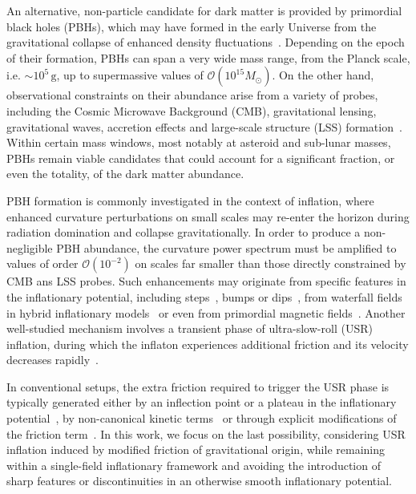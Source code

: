 \documentclass[nofootinbib,aps,a4paper,letterpaper,superscriptaddress,
twocolumn,times]{revtex4}
\renewcommand{\(}{\left(}
\renewcommand{\)}{\right)}
\renewcommand{\(}{\left(}
\renewcommand{\)}{\right)}
\renewcommand{\[}{\left[}
\renewcommand{\]}{\right]}
\begin{document}
An alternative, non-particle candidate for dark matter is provided by primordial 
black holes (PBHs), which may have formed in the early Universe from the 
gravitational collapse of enhanced density fluctuations~\cite{Zeldovich:1967lct, 
Hawking:1971ei, Carr:1974nx}. Depending on the epoch of their formation, PBHs 
can span a very wide mass range, from the Planck scale, i.e. $\sim 
10^{5}\,\mathrm{g}$, up to supermassive values of $\mathcal{O}(10^{15}M_\odot)$. 
On the other hand, observational constraints on their abundance arise from a 
variety of probes, including the Cosmic Microwave Background (CMB), 
gravitational lensing, gravitational waves, accretion effects and large-scale 
structure (LSS) formation~\cite{Sasaki:2018dmp,Carr:2020gox, Green:2020jor,Escriva:2022duf}. Within 
certain mass windows, most notably at asteroid and sub-lunar masses, PBHs remain 
viable candidates that could account for a significant fraction, or even the 
totality, of the dark matter abundance.

PBH formation is commonly investigated in the context of inflation, where 
enhanced curvature perturbations on small scales may re-enter the horizon during 
radiation domination and collapse gravitationally. In order to produce a 
non-negligible PBH abundance, the curvature power spectrum must be amplified to 
values of order $\mathcal{O}(10^{-2})$ on scales far smaller than those directly 
constrained by CMB ans LSS probes. Such enhancements may originate from specific features 
in the inflationary potential, including steps~\cite{Ivanov:1994pa, 
Inomata:2017vxo}, bumps or dips~\cite{Mishra:2019pzq, Ozsoy:2018flq, 
Heydari:2023xts}, from waterfall fields in hybrid inflationary 
models~\cite{Garcia-Bellido:1996mdl, Clesse:2015wea} or even from primordial magnetic fields~\cite{Liang:2025pll, Maiti:2025ijr}. Another well-studied 
mechanism involves a transient phase of ultra-slow-roll (USR) inflation, during 
which the inflaton experiences additional friction and its velocity decreases 
rapidly~\cite{Ivanov:1994pa,Tsamis:2003px, Kinney:2005vj, Martin:2012pe}.

In conventional setups, the extra friction required to trigger the USR phase is 
typically generated either by an inflection point or a plateau in the 
inflationary potential~\cite{Garcia-Bellido:2017mdw, Germani:2017bcs, 
Motohashi:2017kbs}, by non-canonical kinetic terms~\cite{Kamenshchik:2018sig, 
Papanikolaou:2022did, Heydari:2023rmq} or through explicit modifications of the 
friction term~\cite{Romano:2016gop, Dimopoulos:2017ged}. In this work, we focus 
on the last possibility, considering USR inflation induced by modified friction 
of gravitational origin, while remaining within a single-field inflationary framework and 
avoiding the introduction of sharp features or discontinuities in an otherwise 
smooth inflationary potential.
\end{document}
